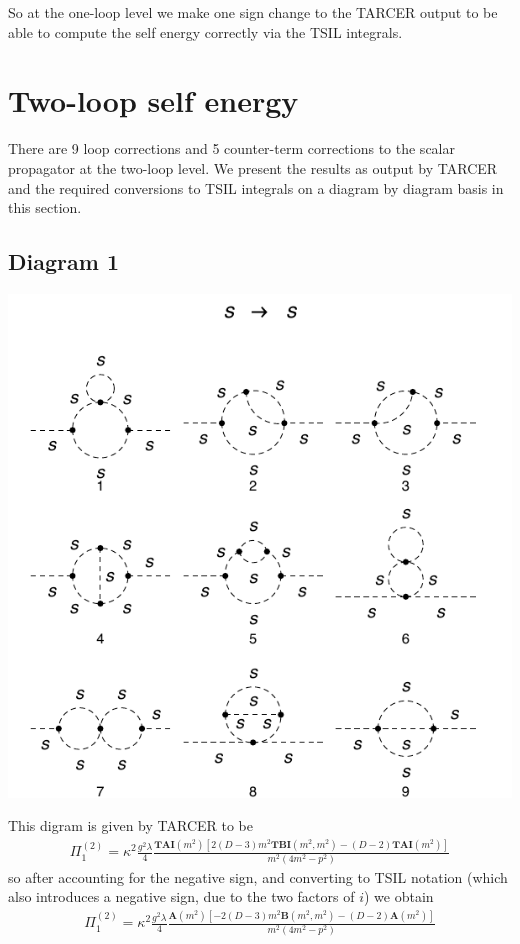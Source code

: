 \documentclass[11pt]{article}
\newcommand{\tsil}{\textsf{TSIL} \! }
\newcommand{\tarcer}{\textsf{TARCER} \! }
\begin{document}
So at the one-loop level we make one sign change to the \tarcer output to be able to compute the self energy correctly via the \tsil integrals.

\section{Two-loop self energy}

There are 9 loop corrections and 5 counter-term corrections to the scalar propagator at the two-loop level.  We present the results as output by \tarcer and the required conversions to \tsil integrals on a diagram by diagram basis in this section.

\subsection*{Diagram 1}
\begin{center}
\includegraphics{2loop_1.pdf}\\
\end{center}
This digram is given by \tarcer to be
\begin{align}
\Pi^{(2)}_1 = \kappa^2\frac{g^2\lambda}{4} \frac{  \mathbf{TAI}(m^2) \left[ 2(D-3)m^2\mathbf{TBI}(m^2,m^2) - (D-2) \mathbf{TAI}(m^2) \right] }{m^2 (4m^2-p^2) }
\end{align}
so after accounting for the negative sign, and converting to TSIL notation (which also introduces a negative sign, due to the two factors of $i$) we obtain
\begin{align}
\Pi^{(2)}_1 = \kappa^2\frac{g^2\lambda}{4} \frac{  \mathbf{A}(m^2) \left[ -2(D-3)m^2\mathbf{B}(m^2,m^2) - (D-2) \mathbf{A}(m^2) \right] }{m^2 (4m^2-p^2) }
\end{align}
\end{document}

